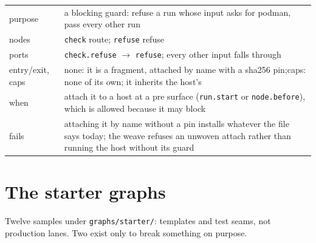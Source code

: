 \begin{center}\footnotesize
\begin{tabular}{@{}>{\raggedright\arraybackslash}p{}>{\raggedright\arraybackslash}p{}@{}}
  purpose & a blocking guard: refuse a run whose input asks for podman, pass every other run \\
  nodes & \texttt{check} route; \texttt{refuse} refuse \\
  ports & \texttt{check.refuse} $\to$ \texttt{refuse}; every other input falls through \\
  entry/exit, caps & none: it is a fragment, attached by name with a sha256 pin;\newline caps: none of its own; it inherits the host's \\
  when & attach it to a host at a pre surface (\texttt{run.start} or \texttt{node.before}),
    which is allowed because it may block \\
  fails & attaching it by name without a pin installs whatever the file says today; the
    weave refuses an unwoven attach rather than running the host without its guard \\
\end{tabular}
\end{center}

\section{The starter graphs}

Twelve samples under \texttt{graphs/starter/}: templates and test seams, not production
lanes. Two exist only to break something on purpose.

